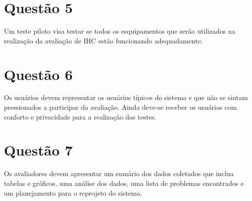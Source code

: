 \section{Questão 5}
Um teste piloto visa testar se todos os esquipamentos que serão utilizados na
realização da avaliação de IHC estão funcionando adequadamente.

\section{Questão 6}
Os usuários devem representar os usuários típicos do sistema e que não se 
sintam pressionados a participar da avaliação. Ainda deve-se receber os 
usuários com conforto e privacidade para a realização dos testes.

\section{Questão 7}
Os avaliadores devem apresentar um sumário dos dados coletados que inclua
tabelas e gráficos, uma análise dos dados, uma lista de problemas encontrados
e um planejamento para o reprojeto do sistema. 





